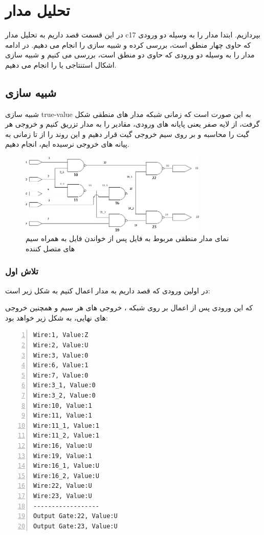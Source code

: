 \section{تحلیل مدار 
}
در این قسمت قصد داریم به تحلیل مدار c17 بپردازیم. ابتدا مدار را به وسیله دو ورودی که حاوی چهار منطق است، بررسی کرده و شبیه سازی 
را انجام می دهیم. در ادامه مدار را به وسیله دو ورودی که حاوی دو منطق است، بررسی می کنیم و شبیه سازی اشکال استنتاجی یا 
را انجام می دهیم.

\subsection{شبیه سازی 
}
شبیه سازی true-value به این صورت است که زمانی شبکه مدار های منطقی شکل گرفت، از لایه صفر یعنی پایانه های ورودی، مقادیر را به مدار تزریق کنیم و خروجی هر گیت را محاسبه و بر روی سیم خروجی گیت قرار دهیم و این روند را از تا زمانی به پیانه های خروجی نرسیده ایم، انجام دهیم.


\begin{figure}[H]
	\begin{center}
		\includegraphics[width=0.8\textwidth]{c17_results/pictures/c17.eps}
	\end{center}
	\caption{
		نمای مدار منطقی مربوط به فایل 
		پس از خواندن فایل به همراه سیم های متصل کننده
	}
	\label{fig:c17}
\end{figure}


\subsubsection{تلاش اول}
در اولین ورودی که قصد داریم به مدار 
 اعمال کنیم به شکل زیر است:


که این ورودی پس از اعمال بر روی شبکه ، خروجی های هر سیم و همچنین خروجی های نهایی، به شکل زیر خواهد بود:

\begin{latin}
\begin{lstlisting}[numbers=left, breaklines=true]
Wire:1, Value:Z 
Wire:2, Value:U 
Wire:3, Value:0 
Wire:6, Value:1 
Wire:7, Value:0 
Wire:3_1, Value:0 
Wire:3_2, Value:0 
Wire:10, Value:1 
Wire:11, Value:1 
Wire:11_1, Value:1 
Wire:11_2, Value:1 
Wire:16, Value:U 
Wire:19, Value:1 
Wire:16_1, Value:U 
Wire:16_2, Value:U 
Wire:22, Value:U 
Wire:23, Value:U 
------------------
Output Gate:22, Value:U 
Output Gate:23, Value:U 
\end{lstlisting}
\end{latin}

